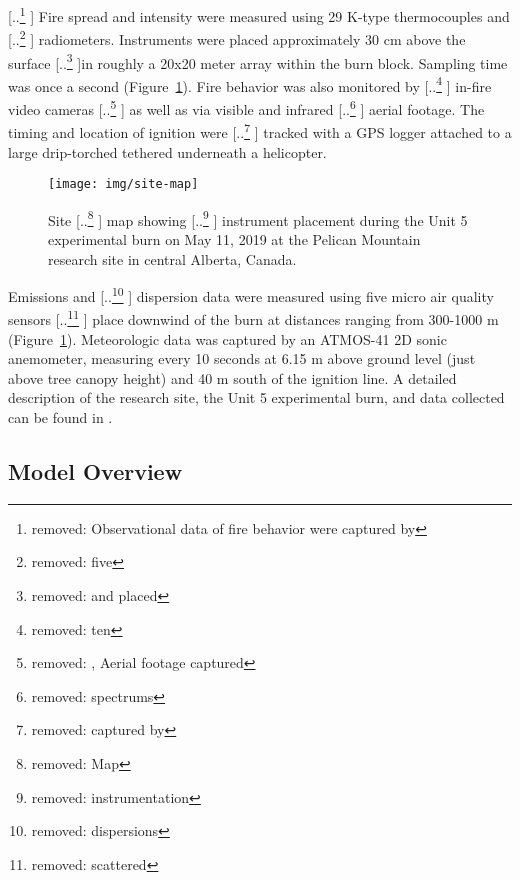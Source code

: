 \documentclass[preprints,article,accept,moreauthors,pdftex]{Definitions/mdpi}
\providecommand{\DIFadd}[1]{{\protect\color{blue} \sf #1}} %
\providecommand{\DIFdel}[1]{{\protect\color{red} [..\footnote{removed: #1} ]}} %
\providecommand{\DIFaddbegin}{} %
\providecommand{\DIFaddend}{} %
\providecommand{\DIFdelbegin}{} %
\providecommand{\DIFdelend}{} %
\providecommand{\DIFaddFL}[1]{\DIFadd{#1}} %
\providecommand{\DIFdelFL}[1]{\DIFdel{#1}} %
\providecommand{\DIFaddbeginFL}{} %
\providecommand{\DIFaddendFL}{} %
\providecommand{\DIFdelbeginFL}{} %
\providecommand{\DIFdelendFL}{} %
\begin{document}
\DIFdelbegin \DIFdel{Observational data of fire behavior were captured by }\DIFdelend \DIFaddbegin \DIFadd{Fire spread and intensity were measured using }\DIFaddend 29 K-type thermocouples and \DIFdelbegin \DIFdel{five }\DIFdelend \DIFaddbegin \DIFadd{5 }\DIFaddend radiometers. Instruments were placed approximately 30 cm above the surface \DIFdelbegin \DIFdel{and placed }\DIFdelend in roughly a 20x20 meter array within the burn block. Sampling time was once a second (Figure~\ref{fig1}). Fire behavior was also monitored by \DIFdelbegin \DIFdel{ten }\DIFdelend \DIFaddbegin \DIFadd{10 }\DIFaddend in-fire video cameras \DIFdelbegin \DIFdel{, Aerial footage captured }\DIFdelend \DIFaddbegin \DIFadd{as well as via }\DIFaddend visible and infrared \DIFdelbegin \DIFdel{spectrums}\DIFdelend \DIFaddbegin \DIFadd{aerial footage}\DIFaddend . The timing and location of ignition were \DIFdelbegin \DIFdel{captured by }\DIFdelend \DIFaddbegin \DIFadd{tracked with }\DIFaddend a GPS logger attached to a large drip-torched tethered underneath a helicopter.


\begin{figure}[H]
\centering
 \texttt{[image: img/site-map]}
 \caption{Site \DIFdelbeginFL \DIFdelFL{Map }\DIFdelendFL \DIFaddbeginFL \DIFaddFL{map }\DIFaddendFL showing \DIFdelbeginFL \DIFdelFL{instrumentation }\DIFdelendFL \DIFaddbeginFL \DIFaddFL{instrument }\DIFaddendFL placement during the Unit 5 experimental burn on May 11, 2019 at the Pelican Mountain research site in central Alberta, Canada. \label{fig1}}
 \end{figure}


Emissions and \DIFdelbegin \DIFdel{dispersions }\DIFdelend \DIFaddbegin \DIFadd{dispersion }\DIFaddend data were measured using five micro air quality sensors \DIFdelbegin \DIFdel{scattered }\DIFdelend \DIFaddbegin \DIFadd{place }\DIFaddend downwind of the burn at distances ranging from 300-1000 m (Figure~\ref{fig1}). Meteorologic data was captured by an ATMOS-41 2D sonic anemometer, measuring every 10 seconds at 6.15 m above ground level (just above tree canopy height) and 40 m south of the ignition line. A detailed description of the research site, the Unit 5 experimental burn, and data collected can be found in \cite{thompson_recent_2020,thompson_data_2020,huda_study_2020}.

\subsection{Model Overview}
\end{document}

